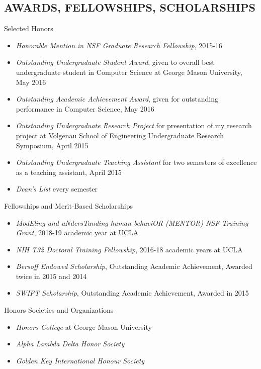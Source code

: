 \documentclass[margin, 10pt]{res} %
\begin{document}
\begin{resume}
\section{AWARDS, FELLOWSHIPS, SCHOLARSHIPS} 

Selected Honors
\begin{itemize} \itemsep -2pt %
\item {\sl Honorable Mention in NSF Graduate Research Fellowship}, 2015-16
\item {\sl Outstanding Undergraduate Student Award}, given to overall best undergraduate student in Computer Science at George Mason University, May 2016
\item {\sl Outstanding Academic Achievement Award}, given for outstanding performance in Computer Science, May 2016
\item {\sl Outstanding Undergraduate Research Project} for presentation of my research project at Volgenau School of Engineering Undergraduate Research Symposium, April 2015
\item {\sl Outstanding Undergraduate Teaching Assistant} for two semesters of excellence as a teaching assistant, April 2015
\item {\sl Dean's List} every semester
\end{itemize}

Fellowships and Merit-Based Scholarships
\begin{itemize} \itemsep -2pt %
\item {\sl ModEling and uNdersTanding human behaviOR (MENTOR) NSF Training Grant}, 2018-19 academic year at UCLA
\item {\sl NIH T32 Doctoral Training Fellowship}, 2016-18 academic years at UCLA
\item {\sl Bersoff Endowed Scholarship}, Outstanding Academic Achievement, Awarded twice in 2015 and 2014
\item {\sl SWIFT Scholarship}, Outstanding Academic Achievement, Awarded in 2015
\end{itemize}

Honors Societies and Organizations
\begin{itemize} \itemsep -2pt %
\item {\sl Honors College} at George Mason University
\item {\sl Alpha Lambda Delta Honor Society}
\item {\sl Golden Key International Honour Society}
\end{itemize}


\end{resume}
\end{document}
